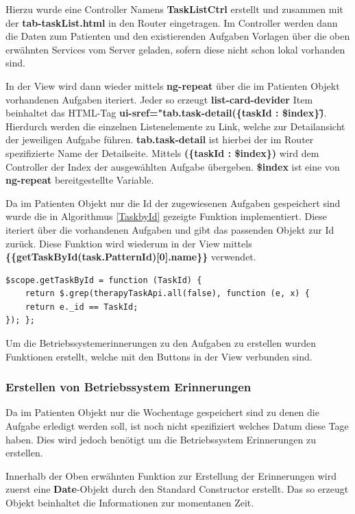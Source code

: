 Hierzu wurde eine Controller Namens \textbf{TaskListCtrl} erstellt und zusammen mit der \textbf{tab-taskList.html} in den Router eingetragen. Im Controller werden dann die Daten zum Patienten und den existierenden Aufgaben Vorlagen über die oben erwähnten Services vom Server geladen, sofern diese nicht schon lokal vorhanden sind.

In der View wird dann wieder mittels \textbf{ng-repeat} über die im Patienten Objekt vorhandenen Aufgaben iteriert. Jeder so erzeugt \textbf{list-card-devider} Item beinhaltet das HTML-Tag \textbf{ui-sref="tab.task-detail(\{taskId : \$index\})\"}. Hierdurch werden die einzelnen Listenelemente zu Link, welche zur Detailansicht der jeweiligen Aufgabe führen. \textbf{tab.task-detail} ist hierbei der im Router spezifizierte Name der Detailseite. Mittels \textbf{(\{taskId : \$index\})} wird dem Controller der Index der ausgewählten Aufgabe übergeben.
\textbf{\$index} ist eine von \textbf{ng-repeat} bereitgestellte Variable.

Da im Patienten Objekt nur die Id der zugewiesenen Aufgaben gespeichert sind wurde die in Algorithmus \ref{TaskbyId} gezeigte Funktion implementiert. Diese iteriert über die vorhandenen Aufgaben und gibt das passenden Objekt zur Id zurück. Diese Funktion wird wiederum in der View mittels \textbf{\{\{getTaskById(task.PatternId)[0].name\}\}} verwendet.

\begin{lstlisting}[caption={Funktion welche den Namen einer Aufgabe abhängig von der Id zurückliefert},label=TaskbyId]
$scope.getTaskById = function (TaskId) {
	return $.grep(therapyTaskApi.all(false), function (e, x) {
	return e._id == TaskId; 
}); };
\end{lstlisting}
Um die Betriebssystemerinnerungen zu den Aufgaben zu erstellen wurden Funktionen erstellt, welche mit den Buttons in der View verbunden sind.

\subsubsection{Erstellen von Betriebssystem Erinnerungen}\label{_ImpPCErinnerungen}
Da im Patienten Objekt nur die Wochentage gespeichert sind zu denen die Aufgabe erledigt werden soll, ist noch nicht spezifiziert welches Datum diese Tage haben. Dies wird jedoch benötigt um die Betriebssystem Erinnerungen zu erstellen.

Innerhalb der Oben erwähnten Funktion zur Erstellung der Erinnerungen wird zuerst eine \textbf{Date}-Objekt durch den Standard Constructor erstellt. Das so erzeugt Objekt beinhaltet die Informationen zur momentanen Zeit.

